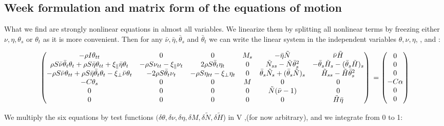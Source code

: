 
\subsection{Week formulation and matrix form of the equations of motion}
What we find are strongly nonlinear equations in almost all variables.
We linearize them by splitting all nonlinear terms by freezing either $\nu, \eta, \theta_s$ or $\theta_t$ as it is more convenient. Then for any $\bar{\nu}, \bar{\eta}, \bar{\theta}_s$ and $\bar{\theta}_t$ we can write the linear system in the independent variables $\theta, \nu, \eta$, ,  and :

\[\begin{pmatrix}
-\rho I \theta_{tt} & 0 & 0 & M_s & -\bar{\eta}\tilde{N} & \bar{\nu}\tilde{H} %
\\
\rho S\bar{\nu}\bar{\theta}_t\theta_t + \rho S \bar{\eta}\theta_{tt} + \xi_{\parallel}\bar{\eta}\theta_t & -\rho S \nu_{tt} -\xi_{\parallel}\nu_t & 2 \rho S\bar{\theta}_t\eta_t & 0 &    \tilde{N}_{ss} - \tilde{N}\bar{\theta}_s^2 & -\bar{\theta}_s \tilde{H}_s - (\bar{\theta}_s \tilde{H})_s 
\\
-\rho S \bar{\nu}\theta_{tt} + \rho S \bar{\eta}\bar{\theta}_t\theta_t - \xi_{\perp}\bar{\nu}\theta_t & - 2\rho S \bar{\theta}_t \nu_t & - \rho S \eta_{tt} - \xi_{\perp}\eta_t & 0 & \bar{\theta}_s \tilde{N}_s + (\bar{\theta}_s \tilde{N})_s & \tilde{H}_{ss}-\tilde{H}\bar{\theta}_s^2 
\\
-C\theta_s & 0 & 0 & M & 0 & 0 
\\
0 & 0 & 0 & 0 & \tilde{N}(\bar{\nu}-1) & 0 
\\
0 & 0 & 0 & 0 & 0 & \tilde{H}\bar{\eta} 
\end{pmatrix}
\\ =
\begin{pmatrix}
0\\
0\\
0\\
-C\alpha\\
0\\
0
\end{pmatrix}\]


We multiply the six equations by test functions
$(\delta \theta, \delta\nu, \delta \eta, \delta M,\delta \tilde{N}, \delta \tilde{H}$) in V ,(for now arbitrary), and we integrate from 0 to 1: 

